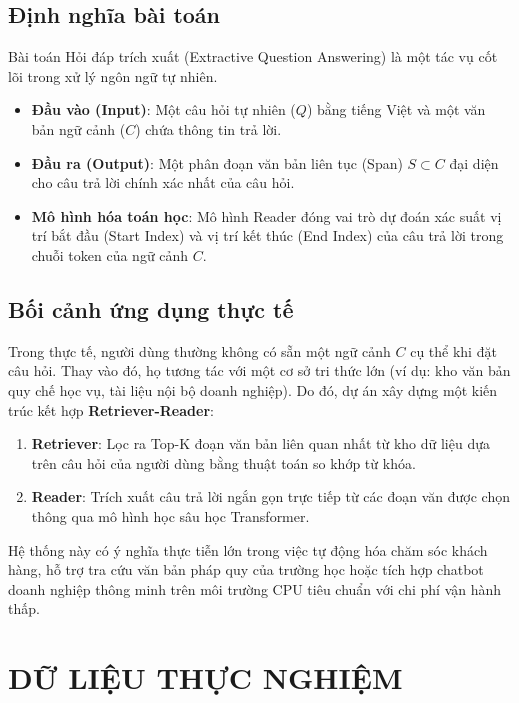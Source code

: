 \documentclass[12pt, a4paper]{article}
\begin{document}
\subsection{Định nghĩa bài toán}
Bài toán Hỏi đáp trích xuất (Extractive Question Answering) là một tác vụ cốt lõi trong xử lý ngôn ngữ tự nhiên. 
\begin{itemize}
    \item \textbf{Đầu vào (Input)}: Một câu hỏi tự nhiên ($Q$) bằng tiếng Việt và một văn bản ngữ cảnh ($C$) chứa thông tin trả lời.
    \item \textbf{Đầu ra (Output)}: Một phân đoạn văn bản liên tục (Span) $S \subset C$ đại diện cho câu trả lời chính xác nhất của câu hỏi.
    \item \textbf{Mô hình hóa toán học}: Mô hình Reader đóng vai trò dự đoán xác suất vị trí bắt đầu (Start Index) và vị trí kết thúc (End Index) của câu trả lời trong chuỗi token của ngữ cảnh $C$.
\end{itemize}

\subsection{Bối cảnh ứng dụng thực tế}
Trong thực tế, người dùng thường không có sẵn một ngữ cảnh $C$ cụ thể khi đặt câu hỏi. Thay vào đó, họ tương tác với một cơ sở tri thức lớn (ví dụ: kho văn bản quy chế học vụ, tài liệu nội bộ doanh nghiệp). 
Do đó, dự án xây dựng một kiến trúc kết hợp \textbf{Retriever-Reader}:
\begin{enumerate}
    \item \textbf{Retriever}: Lọc ra Top-K đoạn văn bản liên quan nhất từ kho dữ liệu dựa trên câu hỏi của người dùng bằng thuật toán so khớp từ khóa.
    \item \textbf{Reader}: Trích xuất câu trả lời ngắn gọn trực tiếp từ các đoạn văn được chọn thông qua mô hình học sâu học Transformer.
\end{enumerate}
Hệ thống này có ý nghĩa thực tiễn lớn trong việc tự động hóa chăm sóc khách hàng, hỗ trợ tra cứu văn bản pháp quy của trường học hoặc tích hợp chatbot doanh nghiệp thông minh trên môi trường CPU tiêu chuẩn với chi phí vận hành thấp.

\section{DỮ LIỆU THỰC NGHIỆM}
\end{document}
